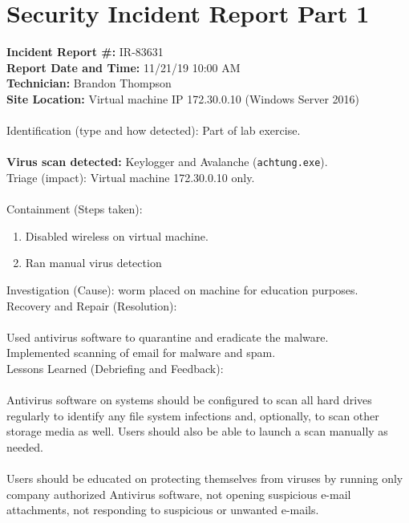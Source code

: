 \documentclass[a4paper]{article}
\begin{document}
	\section*{Security Incident Report Part 1}
	\textbf{Incident Report \#:} IR-83631\\
	\textbf{Report Date and Time:} 11/21/19 10:00 AM\\
	\textbf{Technician:} Brandon Thompson\\
	\textbf{Site Location:} Virtual machine IP 172.30.0.10 (Windows Server 2016)\\
	\\
	Identification (type and how detected): Part of lab exercise.\\
	\\
	\textbf{Virus scan detected:} Keylogger and Avalanche (\texttt{achtung.exe}).\\
	Triage (impact): Virtual machine 172.30.0.10 only.\\
	\\
	Containment (Steps taken):
	\begin{enumerate}
		\item Disabled wireless on virtual machine.
		\item Ran manual virus detection
	\end{enumerate}
	Investigation (Cause): worm placed on machine for education purposes.\\
	Recovery and Repair (Resolution):\\
	\\
	Used antivirus software to quarantine and eradicate the malware.\\
	Implemented scanning of email for malware and spam.\\
	Lessons Learned (Debriefing and Feedback):\\
	\\
	Antivirus software on systems should be configured to scan all hard drives regularly to
	identify any file system infections and, optionally, to scan other storage media as well.
	Users should also be able to launch a scan manually as needed.\\
	\\
	Users should be educated on protecting themselves from viruses by running only company
	authorized Antivirus software, not opening suspicious e-mail attachments, not responding
	to suspicious or unwanted e-mails.\\
	\\
\end{document}

